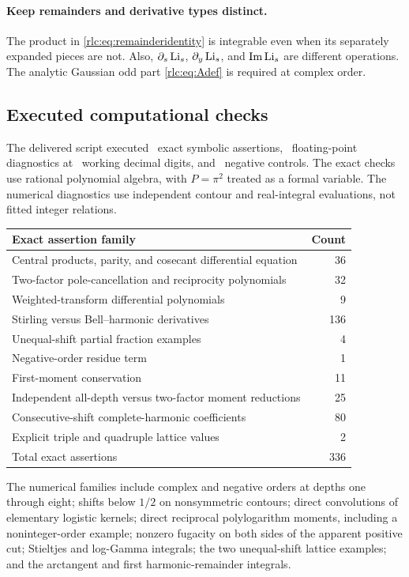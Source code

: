 \paragraph{Keep remainders and derivative types distinct.}
The product in \eqref{rlc:eq:remainderidentity} is integrable even when
its separately expanded pieces are not. Also, $\partial_s\operatorname{Li}_s$,
$\partial_y\operatorname{Li}_s$, and $\operatorname{Im}\operatorname{Li}_s$ are different operations.
The analytic Gaussian odd part \eqref{rlc:eq:Adef} is required at
complex order.

\subsection{Executed computational checks}

The delivered script  executed \ExactCount\ exact
symbolic assertions, \NumericCount\ floating-point diagnostics at
\WorkingDigits\ working decimal digits, and \NegativeCount\ negative
controls. The exact checks use rational polynomial algebra, with
$P=\pi^2$ treated as a formal variable. The numerical diagnostics use
independent contour and real-integral evaluations, not fitted integer
relations.

\begin{center}
\begin{tabular}{@{}lr@{}}
\toprule
Exact assertion family & Count\\
\midrule
Central products, parity, and cosecant differential equation &36\\
Two-factor pole-cancellation and reciprocity polynomials &32\\
Weighted-transform differential polynomials &9\\
Stirling versus Bell--harmonic derivatives &136\\
Unequal-shift partial fraction examples &4\\
Negative-order residue term &1\\
First-moment conservation &11\\
Independent all-depth versus two-factor moment reductions &25\\
Consecutive-shift complete-harmonic coefficients &80\\
Explicit triple and quadruple lattice values &2\\
\midrule
Total exact assertions &336\\
\bottomrule
\end{tabular}
\end{center}

The numerical families include complex and negative orders at depths
one through eight; shifts below $1/2$ on nonsymmetric contours;
direct convolutions of elementary logistic kernels; direct reciprocal
polylogarithm moments, including a noninteger-order example; nonzero
fugacity on both sides of the apparent positive cut; Stieltjes and
log-Gamma integrals; the two unequal-shift lattice examples; and the
arctangent and first harmonic-remainder integrals.

